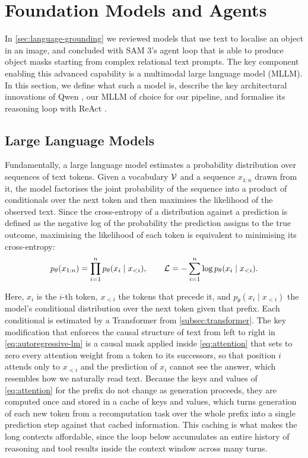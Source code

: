 \section{Foundation Models and Agents}
\label{sec:foundation-models-agents}

In \cref{sec:language-grounding} we reviewed models that use text to localise an object in an image, and concluded with SAM 3's agent loop that is able to produce object masks starting from complex relational text prompts. The key component enabling this advanced capability is a multimodal large language model (MLLM). In this section, we define what such a model is, describe the key architectural innovations of Qwen \cite{qwen35blog}, our MLLM of choice for our pipeline, and formalise its reasoning loop with ReAct \cite{yao2023react}.

\newpage
\subsection{Large Language Models}
\label{subsec:llm}

Fundamentally, a large language model estimates a probability distribution over sequences of text tokens. Given a vocabulary $\mathcal{V}$ and a sequence $x_{1:n}$ drawn from it, the model factorises the joint probability of the sequence into a product of conditionals over the next token and then maximises the likelihood of the observed text. Since the cross-entropy of a distribution against a prediction is defined as the negative log of the probability the prediction assigns to the true outcome, maximising the likelihood of each  token is equivalent to minimising its cross-entropy:
\begin{equation}
  p_\theta(x_{1:n}) = \prod_{i=1}^{n} p_\theta(x_i \mid x_{<i}),
  \qquad
  \mathcal{L} = -\sum_{i=1}^{n} \log p_\theta(x_i \mid x_{<i}).
  \label{eq:autoregressive-lm}
\end{equation}

Here, $x_i$ is the $i$-th token, $x_{<i}$ the tokens that precede it, and
$p_\theta(x_i \mid x_{<i})$ the model's conditional distribution over the next token given that
prefix. Each conditional is estimated by a Transformer from \cref{subsec:transformer}.
The key modification that enforces the causal structure of text from left to right in
\cref{eq:autoregressive-lm} is a causal mask applied inside \cref{eq:attention} that
sets to zero every attention weight from a token to its successors, so that position $i$
attends only to $x_{<i}$ and the prediction of $x_i$ cannot see the answer, which resembles how we naturally read text. Because the keys and values of \cref{eq:attention} for the prefix do not change as generation
proceeds, they are computed once and stored in a cache of keys and values, which turns generation
of each new token from a recomputation task over the whole prefix into a single prediction step against
that cached information. This caching is what makes the long contexts affordable, since
the loop below accumulates an entire history of reasoning and tool results inside the
context window across many turns.

